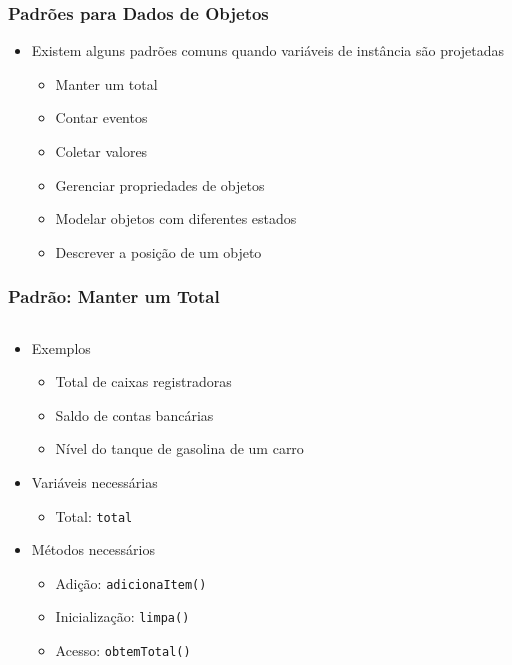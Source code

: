 \documentclass[xcolor={dvipsnames,table},aspectratio=169]{beamer}
\begin{document}
\begin{frame}\frametitle{Padrões para Dados de Objetos}
\begin{itemize}
	\item Existem alguns padrões comuns quando variáveis de instância são projetadas
	\begin{itemize}
		\item Manter um total
		\item Contar eventos
		\item Coletar valores
		\item Gerenciar propriedades de objetos
		\item Modelar objetos com diferentes estados
		\item Descrever a posição de um objeto
	\end{itemize}
\end{itemize}
\end{frame}

\begin{frame}[fragile]\frametitle{Padrão: Manter um Total}
\begin{columns}[T]
	\begin{column}{0.5\linewidth}
\begin{itemize}
	\item Exemplos
	\begin{itemize}
		\item Total de caixas registradoras
		\item Saldo de contas bancárias
		\item Nível do tanque de gasolina de um carro
	\end{itemize}
	\item Variáveis necessárias
	\begin{itemize}
		\item Total: \texttt{total}
	\end{itemize}
	\item Métodos necessários
	\begin{itemize}
		\item Adição: \texttt{adicionaItem()}
		\item Inicialização: \texttt{limpa()}
		\item Acesso: \texttt{obtemTotal()}
	\end{itemize}
\end{itemize}
	\end{column}
	\begin{column}{0.5\linewidth}
{\scriptsize\inputminted[bgcolor=cyan!10]{java}{src/caixa0/CaixaRegistradora.java}}
	\end{column}
\end{columns}
\end{frame}
\end{document}
